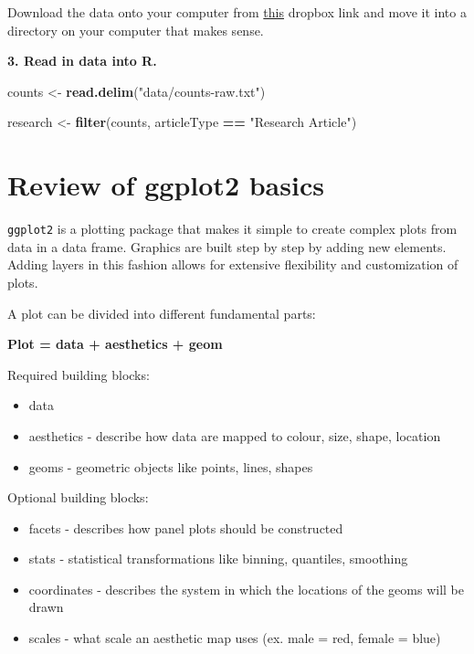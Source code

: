 \documentclass[
]{book}
\newenvironment{Shaded}{\begin{snugshade}}{\end{snugshade}}
\newcommand{\KeywordTok}[1]{\textcolor[rgb]{0.13,0.29,0.53}{\textbf{#1}}}
\newcommand{\NormalTok}[1]{#1}
\newcommand{\OperatorTok}[1]{\textcolor[rgb]{0.81,0.36,0.00}{\textbf{#1}}}
\newcommand{\StringTok}[1]{\textcolor[rgb]{0.31,0.60,0.02}{#1}}
\providecommand{\tightlist}{%
  \setlength{\itemsep}{0pt}\setlength{\parskip}{0pt}}
\begin{document}
Download the data onto your computer from \href{https://www.dropbox.com/s/up38z3fd4llanrb/counts-raw.txt?dl=0}{this} dropbox link and move it into a directory on your computer that makes sense.

\textbf{3. Read in data into R.}

\begin{Shaded}
\begin{Highlighting}[]
\NormalTok{counts <-}\StringTok{ }\KeywordTok{read.delim}\NormalTok{(}\StringTok{"data/counts-raw.txt"}\NormalTok{)}

\NormalTok{research <-}\StringTok{ }\KeywordTok{filter}\NormalTok{(counts, articleType }\OperatorTok{==}\StringTok{ "Research Article"}\NormalTok{)}
\end{Highlighting}
\end{Shaded}

\hypertarget{review-of-ggplot2-basics}{%
\section{Review of ggplot2 basics}\label{review-of-ggplot2-basics}}

\texttt{ggplot2} is a plotting package that makes it simple to create complex plots from data in a data frame. Graphics are built step by step by adding new elements. Adding layers in this fashion allows for extensive flexibility and customization of plots.

A plot can be divided into different fundamental parts:

\textbf{Plot = data + aesthetics + geom}

Required building blocks:

\begin{itemize}
\tightlist
\item
  data
\item
  aesthetics - describe how data are mapped to colour, size, shape, location
\item
  geoms - geometric objects like points, lines, shapes
\end{itemize}

Optional building blocks:

\begin{itemize}
\tightlist
\item
  facets - describes how panel plots should be constructed
\item
  stats - statistical transformations like binning, quantiles, smoothing
\item
  coordinates - describes the system in which the locations of the geoms will be drawn
\item
  scales - what scale an aesthetic map uses (ex. male = red, female = blue)
\end{itemize}
\end{document}
